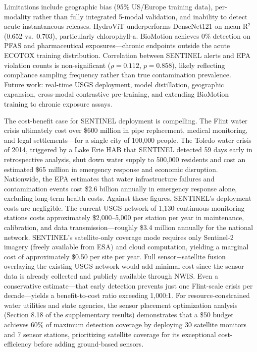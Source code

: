 \documentclass[12pt]{article}
\begin{document}
Limitations include geographic bias (95\% US/Europe training data), per-modality rather than fully integrated 5-modal validation, and inability to detect acute instantaneous releases. HydroViT underperforms DenseNet121 on mean R$^2$ (0.652 vs.\ 0.703), particularly chlorophyll-a. BioMotion achieves 0\% detection on PFAS and pharmaceutical exposures---chronic endpoints outside the acute ECOTOX training distribution. Correlation between SENTINEL alerts and EPA violation counts is non-significant ($\rho = 0.112$, $p = 0.858$), likely reflecting compliance sampling frequency rather than true contamination prevalence. Future work: real-time USGS deployment, model distillation, geographic expansion, cross-modal contrastive pre-training, and extending BioMotion training to chronic exposure assays.

The cost-benefit case for SENTINEL deployment is compelling. The Flint water crisis ultimately cost over \$600 million in pipe replacement, medical monitoring, and legal settlements---for a single city of 100,000 people. The Toledo water crisis of 2014, triggered by a Lake Erie HAB that SENTINEL detected 59 days early in retrospective analysis, shut down water supply to 500,000 residents and cost an estimated \$65 million in emergency response and economic disruption. Nationwide, the EPA estimates that water infrastructure failures and contamination events cost \$2.6 billion annually in emergency response alone, excluding long-term health costs. Against these figures, SENTINEL's deployment costs are negligible. The current USGS network of 1,130 continuous monitoring stations costs approximately \$2,000--5,000 per station per year in maintenance, calibration, and data transmission---roughly \$3.4 million annually for the national network. SENTINEL's satellite-only coverage mode requires only Sentinel-2 imagery (freely available from ESA) and cloud computation, yielding a marginal cost of approximately \$0.50 per site per year. Full sensor+satellite fusion overlaying the existing USGS network would add minimal cost since the sensor data is already collected and publicly available through NWIS. Even a conservative estimate---that early detection prevents just one Flint-scale crisis per decade---yields a benefit-to-cost ratio exceeding 1,000:1. For resource-constrained water utilities and state agencies, the sensor placement optimization analysis (Section 8.18 of the supplementary results) demonstrates that a \$50 budget achieves 60\% of maximum detection coverage by deploying 30 satellite monitors and 7 sensor stations, prioritizing satellite coverage for its exceptional cost-efficiency before adding ground-based sensors.
\end{document}
